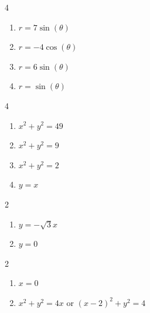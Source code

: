 \documentclass{ximera}
\begin{document}
\begin{multicols}{4}

\begin{enumerate}

\setcounter{enumi}{\value{HW}}

\item $r = 7\sin(\theta)$
\item $r= -4\cos(\theta)$
\item $r = 6\sin(\theta)$
\item $r = \sin(\theta)$

\setcounter{HW}{\value{enumi}}

\end{enumerate}

\end{multicols}

\begin{multicols}{4}

\begin{enumerate}

\setcounter{enumi}{\value{HW}}

\item $x^{2} + y^{2} = 49$
\item $x^{2} + y^{2} = 9$
\item $x^{2} + y^{2} = 2$
\item $y=x$

\setcounter{HW}{\value{enumi}}

\end{enumerate}

\end{multicols}

\begin{multicols}{2}

\begin{enumerate}

\setcounter{enumi}{\value{HW}}

\item $y = -\sqrt{3}x$
\item $y=0$

\setcounter{HW}{\value{enumi}}

\end{enumerate}

\end{multicols}

\begin{multicols}{2}

\begin{enumerate}

\setcounter{enumi}{\value{HW}}

\item $x=0$
\item  $x^2 + y^2 = 4x$ or $(x-2)^2 + y^2 = 4$

\setcounter{HW}{\value{enumi}}

\end{enumerate}

\end{multicols}
\end{document}
